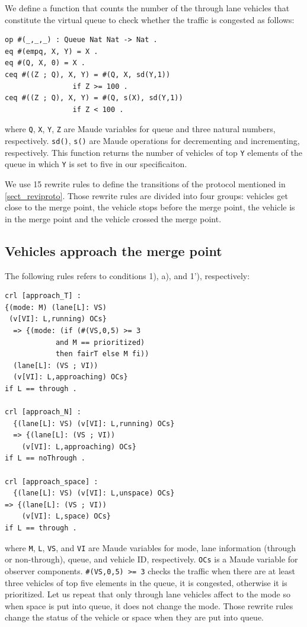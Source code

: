 \documentclass[10pt, conference, compsocconf]{IEEEtran}
\begin{document}
We define a function that counts the number of the through lane
vehicles that constitute the virtual queue to check whether the 
traffic is congested as follows:
\begin{small}
\begin{verbatim}
op #(_,_,_) : Queue Nat Nat -> Nat .
eq #(empq, X, Y) = X .
eq #(Q, X, 0) = X .
ceq #((Z ; Q), X, Y) = #(Q, X, sd(Y,1)) 
                if Z >= 100 .
ceq #((Z ; Q), X, Y) = #(Q, s(X), sd(Y,1)) 
                if Z < 100 .
\end{verbatim}
\end{small}
\noindent where \verb!Q!, \verb!X!, \verb!Y!, \verb!Z! are Maude variables 
for queue and three natural numbers, respectively. \verb!sd()!, \verb!s()! are 
Maude operations for decrementing and incrementing, respectively.
This function returns the number of vehicles of top \verb!Y! elements of the queue
in which \verb!Y! is set to five in our specificaiton. 
 
We use 15 rewrite rules to define the transitions of the protocol mentioned in \ref{sect_reviproto}.
Those rewrite rules are divided into four groups: vehicles get close to the merge point,
the vehicle stops before the merge point, the vehicle is in the merge point and 
the vehicle crossed the merge point.

\subsection{Vehicles approach the merge point}
The following rules refers to conditions 1), a), and 1'), respectively:
\begin{small}
  \begin{verbatim}
crl [approach_T] : 
{(mode: M) (lane[L]: VS) 
 (v[VI]: L,running) OCs} 
  => {(mode: (if (#(VS,0,5) >= 3 
            and M == prioritized) 
            then fairT else M fi))
  (lane[L]: (VS ; VI)) 
  (v[VI]: L,approaching) OCs} 
if L == through .

crl [approach_N] : 
  {(lane[L]: VS) (v[VI]: L,running) OCs} 
  => {(lane[L]: (VS ; VI)) 
    (v[VI]: L,approaching) OCs} 
if L == noThrough .

crl [approach_space] : 
  {(lane[L]: VS) (v[VI]: L,unspace) OCs} 
=> {(lane[L]: (VS ; VI)) 
    (v[VI]: L,space) OCs} 
if L == through .
  \end{verbatim}
\end{small}

\noindent where \verb!M!, \verb!L!, \verb!VS!, and \verb!VI! 
are Maude variables for mode, lane information (through or non-through), queue, and vehicle ID, respectively.
\verb!OCs! is a Maude variable for observer components.
\verb!#(VS,0,5) >= 3! checks the traffic when there are at least three
vehicles of top five elements in the queue, it is congested, otherwise 
it is prioritized. Let us repeat that only through lane vehicles affect
to the mode so when space is put into queue, it does not change the mode.
Those rewrite rules change the status of the vehicle or space when they are put into queue.
\end{document}
